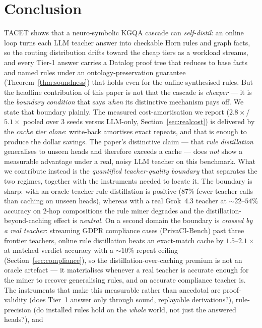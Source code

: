 \documentclass[11pt]{article}
\theoremstyle{plain}
\begin{document}
\section{Conclusion}

TACET shows that a neuro-symbolic KGQA cascade can \emph{self-distil}: an
online loop turns each LLM teacher answer into checkable Horn rules and graph
facts, so the routing distribution drifts toward the cheap tiers as a workload
streams, and every Tier-1 answer carries a Datalog proof tree that reduces to
base facts and named rules under an ontology-preservation guarantee
(Theorem~\ref{thm:soundness}) that holds even for the online-synthesised rules.
But the headline contribution of this paper is not that the cascade is
\emph{cheaper} --- it is the \emph{boundary condition} that says \emph{when} its
distinctive mechanism pays off. We state that boundary plainly. The measured
cost-amortisation we report ($2.8\times$/$5.1\times$ pooled over 3 seeds versus LLM-only,
Section~\ref{sec:realcost}) is delivered by the \emph{cache tier alone}:
write-back amortises exact repeats, and that is enough to produce the dollar
savings. The paper's distinctive claim --- that \emph{rule distillation}
generalises to unseen heads and therefore exceeds a cache --- does \emph{not}
show a measurable advantage under a real, noisy LLM teacher on this benchmark.
What we contribute instead is the \emph{quantified teacher-quality boundary} that
separates the two regimes, together with the instruments needed to locate it. The
boundary is sharp: with an oracle teacher rule distillation is positive ($87\%$
fewer teacher calls than caching on unseen heads), whereas with a real Grok~4.3
teacher at ${\sim}22$--$54\%$ accuracy on $2$-hop compositions the rule miner degrades
and the distillation-beyond-caching effect is \emph{neutral}.
On a second domain the boundary is \emph{crossed by a real teacher}: streaming
GDPR compliance cases (PrivaCI-Bench) past three frontier teachers, online rule
distillation beats an exact-match cache by $1.5$--$2.1\times$ at matched verdict
accuracy with a ${\sim}10\%$ repeat ceiling (Section~\ref{sec:compliance}), so the
distillation-over-caching premium is not an oracle artefact --- it materialises
whenever a real teacher is accurate enough for the miner to recover generalising
rules, and an accurate compliance teacher is.
The instruments
that make this measurable rather than anecdotal are proof-validity (does Tier~1
answer only through sound, replayable derivations?), rule-precision (do installed
rules hold on the \emph{whole} world, not just the answered heads?), and
\end{document}
